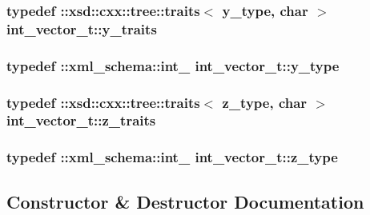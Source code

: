 \subsubsection[{\texorpdfstring{y\+\_\+traits}{y_traits}}]{\setlength{\rightskip}{0pt plus 5cm}typedef \+::xsd\+::cxx\+::tree\+::traits$<$ {\bf y\+\_\+type}, char $>$ {\bf int\+\_\+vector\+\_\+t\+::y\+\_\+traits}}\hypertarget{classint__vector__t_a2575b8ba0507d56caa435e393853e0ff}{}\label{classint__vector__t_a2575b8ba0507d56caa435e393853e0ff}
\subsubsection[{\texorpdfstring{y\+\_\+type}{y_type}}]{\setlength{\rightskip}{0pt plus 5cm}typedef \+::{\bf xml\+\_\+schema\+::int\+\_\+} {\bf int\+\_\+vector\+\_\+t\+::y\+\_\+type}}\hypertarget{classint__vector__t_a7aa2a9276bdee3fad0e216343485a844}{}\label{classint__vector__t_a7aa2a9276bdee3fad0e216343485a844}
\subsubsection[{\texorpdfstring{z\+\_\+traits}{z_traits}}]{\setlength{\rightskip}{0pt plus 5cm}typedef \+::xsd\+::cxx\+::tree\+::traits$<$ {\bf z\+\_\+type}, char $>$ {\bf int\+\_\+vector\+\_\+t\+::z\+\_\+traits}}\hypertarget{classint__vector__t_a867c91a38d505be5f9a8c1a72e4e48ba}{}\label{classint__vector__t_a867c91a38d505be5f9a8c1a72e4e48ba}
\subsubsection[{\texorpdfstring{z\+\_\+type}{z_type}}]{\setlength{\rightskip}{0pt plus 5cm}typedef \+::{\bf xml\+\_\+schema\+::int\+\_\+} {\bf int\+\_\+vector\+\_\+t\+::z\+\_\+type}}\hypertarget{classint__vector__t_a20a60edf9f56f9455dc62b4e5f547bc3}{}\label{classint__vector__t_a20a60edf9f56f9455dc62b4e5f547bc3}


\subsection{Constructor \& Destructor Documentation}
